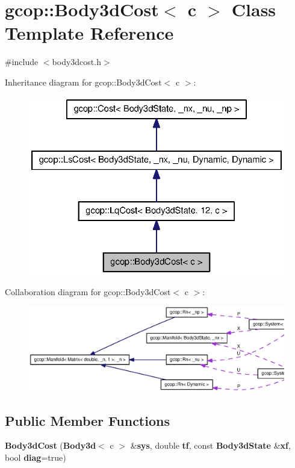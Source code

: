 \section{gcop\-:\-:\-Body3d\-Cost$<$ c $>$ \-Class \-Template \-Reference}
\label{classgcop_1_1Body3dCost}


{\ttfamily \#include $<$body3dcost.\-h$>$}



\-Inheritance diagram for gcop\-:\-:\-Body3d\-Cost$<$ c $>$\-:\nopagebreak
\begin{figure}[H]
\begin{center}
\leavevmode
\includegraphics[width=326pt]{classgcop_1_1Body3dCost__inherit__graph}
\end{center}
\end{figure}


\-Collaboration diagram for gcop\-:\-:\-Body3d\-Cost$<$ c $>$\-:\nopagebreak
\begin{figure}[H]
\begin{center}
\leavevmode
\includegraphics[width=350pt]{classgcop_1_1Body3dCost__coll__graph}
\end{center}
\end{figure}
\subsection*{\-Public \-Member \-Functions}
\begin{DoxyCompactItemize}
\item 
{\bf \-Body3d\-Cost} ({\bf \-Body3d}$<$ c $>$ \&{\bf sys}, double {\bf tf}, const {\bf \-Body3d\-State} \&{\bf xf}, bool {\bf diag}=true)
\end{DoxyCompactItemize}
